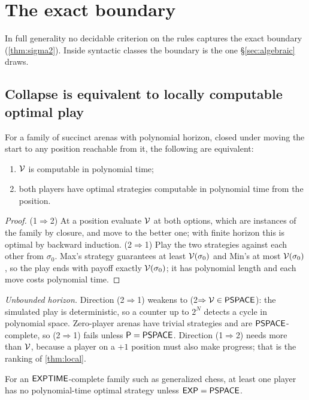 \section{The exact boundary}\label{sec:boundary}

In full generality no decidable criterion on the rules captures the exact boundary (\cref{thm:sigma2}). Inside syntactic classes the boundary is the one \S\ref{sec:algebraic} draws.

\subsection{Collapse is equivalent to locally computable optimal play}
\begin{theorem}\label{thm:strategies}
For a family of succinct arenas with polynomial horizon, closed under moving the start to any position reachable from it, the following are equivalent:
\begin{enumerate}[label=\textup{(\arabic*)}]
\item $\mathcal{V}$ is computable in polynomial time;
\item both players have optimal strategies computable in polynomial time from the position.
\end{enumerate}
\end{theorem}
\begin{proof}
(1$\Rightarrow$2) At a position evaluate $\mathcal{V}$ at both options, which are instances of the family by closure, and move to the better one; with finite horizon this is optimal by backward induction. (2$\Rightarrow$1) Play the two strategies against each other from $\sigma_0$. Max's strategy guarantees at least $\mathcal{V}(\sigma_0)$ and Min's at most $\mathcal{V}(\sigma_0)$, so the play ends with payoff exactly $\mathcal{V}(\sigma_0)$; it has polynomial length and each move costs polynomial time.
\end{proof}

\noindent\emph{Unbounded horizon.} Direction (2$\Rightarrow$1) weakens to (2$\Rightarrow\mathcal{V}\in\mathsf{PSPACE}$): the simulated play is deterministic, so a counter up to $2^N$ detects a cycle in polynomial space. Zero-player arenas have trivial strategies and are $\mathsf{PSPACE}$-complete, so (2$\Rightarrow$1) fails unless $\mathsf{P}=\mathsf{PSPACE}$. Direction (1$\Rightarrow$2) needs more than $\mathcal{V}$, because a player on a $+1$ position must also make progress; that is the ranking of \cref{thm:local}.

\begin{corollary}\label{cor:chess}
For an $\mathsf{EXPTIME}$-complete family such as generalized chess, at least one player has no polynomial-time optimal strategy unless $\mathsf{EXP}=\mathsf{PSPACE}$.
\end{corollary}

